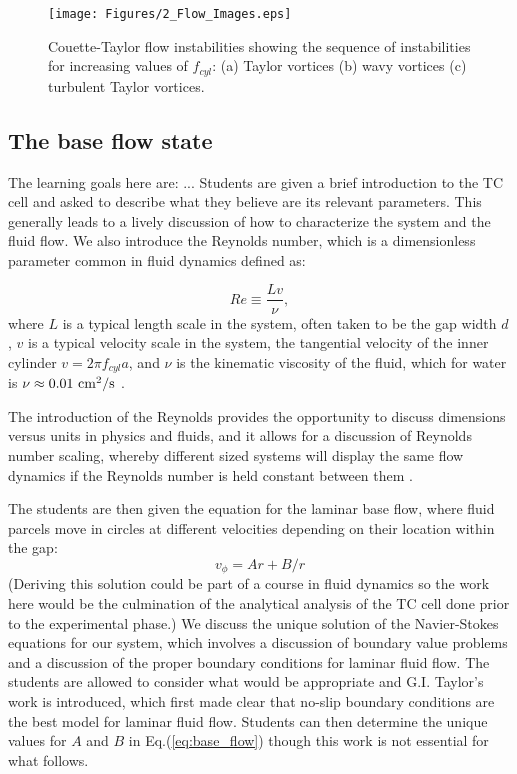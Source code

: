 \documentclass[%
 amsmath,amssymb,
 aps,
floatfix,
aps,prd,longbibliography,
notitlepage
]{revtex4-1}
\newcommand{\BE}{\begin{equation}}
\newcommand{\EE}{\end{equation}}
\begin{document}
\begin{figure}[ht]
  \centering
    \texttt{[image: Figures/2\_Flow\_Images.eps]}
    \caption{Couette-Taylor flow instabilities showing the sequence of instabilities for increasing values of $f_{cyl}$: (a) Taylor vortices (b) wavy vortices (c) turbulent Taylor vortices.}\label{fig:flow_patterns}
\end{figure}

\subsection{The base flow state}
The learning goals here are: ...
Students are given a brief introduction to the TC cell and asked to describe what they believe are its relevant parameters. This generally leads to a lively discussion of how to characterize the system and the fluid flow. We also introduce the Reynolds number, which is a dimensionless parameter common in fluid dynamics defined as:

\BE
Re\equiv \frac{Lv}{\nu},
\EE
where $L$ is a typical length scale in the system, often taken to be the gap width $d$, $v$ is a typical velocity scale in the system, the tangential velocity of the inner cylinder $v=2\pi f_{cyl}a$, and $\nu$ is the kinematic viscosity of the fluid, which for water is $\nu\approx 0.01~\rm cm^2/ s$  \cite{fluids_general}.

The introduction of the Reynolds provides the opportunity to discuss dimensions versus units in physics and fluids, and it allows for a discussion of Reynolds number scaling, whereby different sized systems will display the same flow dynamics if the Reynolds number is held constant between them \cite{fluids_general}.

The students are then given the equation for the laminar base flow, where fluid parcels move in circles at different velocities depending on their location within the gap: 
\BE
v_\phi = Ar + B/r
\label{eq:base_flow}
\EE
(Deriving this solution could be part of a course in fluid dynamics so the work here would be the culmination of the analytical analysis of the TC cell done prior to the experimental phase.) We discuss the unique solution of the Navier-Stokes equations for our system, which involves a discussion of boundary value problems and a discussion of the proper boundary conditions for laminar fluid flow. The students are allowed to consider what would be appropriate and G.I. Taylor's work is introduced, which first made clear that no-slip boundary conditions are the best model for laminar fluid flow. Students can then determine the unique values for $A$ and $B$ in Eq.(\ref{eq:base_flow}) though this work is not essential for what follows. 
\end{document}
